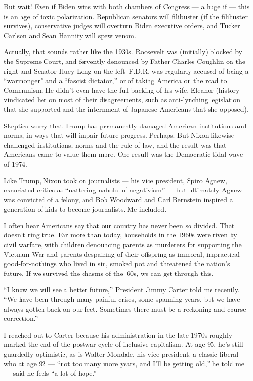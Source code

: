 But wait! Even if Biden wins with both chambers of Congress --- a huge
if --- this is an age of toxic polarization. Republican senators will
filibuster (if the filibuster survives), conservative judges will
overturn Biden executive orders, and Tucker Carlson and Sean Hannity
will spew venom.

Actually, that sounds rather like the 1930s. Roosevelt was (initially)
blocked by the Supreme Court, and fervently denounced by Father Charles
Coughlin on the right and Senator Huey Long on the left. F.D.R. was
regularly accused of being a ``warmonger'' and a ``fascist dictator,''
or of taking America on the road to Communism. He didn't even have the
full backing of his wife, Eleanor (history vindicated her on most of
their disagreements, such as anti-lynching legislation that she
supported and the internment of Japanese-Americans that she opposed).

Skeptics worry that Trump has permanently damaged American institutions
and norms, in ways that will impair future progress. Perhaps. But Nixon
likewise challenged institutions, norms and the rule of law, and the
result was that Americans came to value them more. One result was the
Democratic tidal wave of 1974.

Like Trump, Nixon took on journalists --- his vice president, Spiro
Agnew, excoriated critics as ``nattering nabobs of negativism'' --- but
ultimately Agnew was convicted of a felony, and Bob Woodward and Carl
Bernstein inspired a generation of kids to become journalists. Me
included.

I often hear Americans say that our country has never been so divided.
That doesn't ring true. Far more than today, households in the 1960s
were riven by civil warfare, with children denouncing parents as
murderers for supporting the Vietnam War and parents despairing of their
offspring as immoral, impractical good-for-nothings who lived in sin,
smoked pot and threatened the nation's future. If we survived the chasms
of the '60s, we can get through this.

``I know we will see a better future,'' President Jimmy Carter told me
recently. ``We have been through many painful crises, some spanning
years, but we have always gotten back on our feet. Sometimes there must
be a reckoning and course correction.''

I reached out to Carter because his administration in the late 1970s
roughly marked the end of the postwar cycle of inclusive capitalism. At
age 95, he's still guardedly optimistic, as is Walter Mondale, his vice
president, a classic liberal who at age 92 --- ``not too many more
years, and I'll be getting old,'' he told me --- said he feels ``a lot
of hope.''

